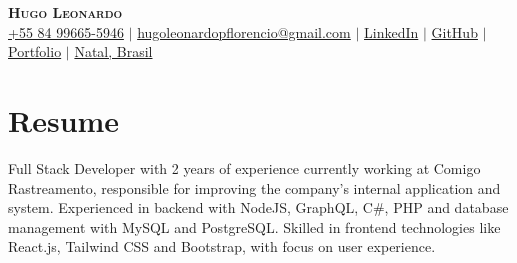 \documentclass[letterpaper,11pt]{article}
\newcommand{\resumeSubHeadingListStart}{\begin{itemize}[leftmargin=0.15in, label={}]}
\newcommand{\resumeSubHeadingListEnd}{\end{itemize}}
\begin{document}

\begin{center}
    \textbf{\Huge \scshape Hugo Leonardo} \\ \vspace{3pt}
    \small
    \faMobile \hspace{.5pt} \href{tel:5584996655946}{+55 84 99665-5946}
    $|$
    \faAt \hspace{.5pt} \href{mailto:hugoleonardopflorencio@gmail.com}{hugoleonardopflorencio@gmail.com}
    $|$
    \faLinkedinSquare \hspace{.5pt} \href{https://www.linkedin.com/in/hugo-leonardo-dev/}{LinkedIn}
    $|$
    \faGithub \hspace{.5pt} \href{https://github.com/hugo-leonardo-dev}{GitHub}
    $|$
    \faGlobe \hspace{.5pt} \href{https://hugoleonardo-portfolio.vercel.app/}{Portfolio}
    $|$
    \faMapMarker \hspace{.5pt} \href{https://www.google.com/maps/place/Universidade+Potiguar/@-5.8142926,-35.208523,17z/data=!3m1!4b1!4m6!3m5!1s0x7b2fff078a448af:0x2940929cd12bc0b6!8m2!3d-5.8142979!4d-35.2059481!16s%2Fg%2F1pxw2_tms?entry=ttu&g_ep=EgoyMDI1MDQwOC4wIKXMDSoASAFQAw%3D%3D}{Natal, Brasil}
\end{center}




\section{Resume}
  \vspace{3pt}
  \resumeSubHeadingListStart
    \small{\item{
          Full Stack Developer with 2 years of experience currently working at Comigo Rastreamento, responsible for improving the company's internal application and system. Experienced in backend with NodeJS, GraphQL, C\#, PHP and database management with MySQL and PostgreSQL. Skilled in frontend technologies like React.js, Tailwind CSS and Bootstrap, with focus on user experience.
    }}
  \resumeSubHeadingListEnd


\end{document}
